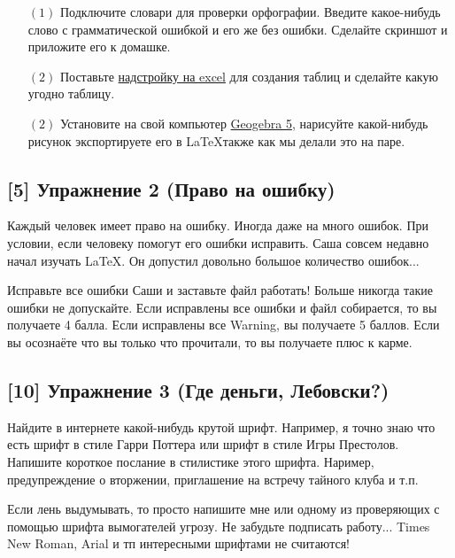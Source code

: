 \documentclass[12pt, a4paper, oneside]{article}
\begin{document}

\begin{itemize}
	\item[$(1)$]  Подключите словари для проверки орфографии. Введите какое-нибудь слово с грамматической ошибкой и его же без ошибки. Сделайте скриншот и приложите его к домашке. 
	\item [$(2)$]  Поставьте \href{https://www.ctan.org/pkg/excel2latex}{надстройку на excel} для создания таблиц и сделайте какую угодно таблицу. 
	\item[$(2)$]  Установите на свой компьютер \href{https://www.geogebra.org/download?lang=ru }{Geogebra 5}, нарисуйте какой-нибудь рисунок экспортируете его в \LaTeX также как мы делали это на паре. 
\end{itemize}


\subsection*{[5]  Упражнение 2 (Право на ошибку)}

Каждый человек имеет право на ошибку. Иногда даже на много ошибок. При условии, если человеку помогут его ошибки исправить. Саша совсем недавно начал изучать \LaTeX{}. Он допустил довольно большое количество ошибок...

Исправьте все ошибки Саши и заставьте файл работать! Больше никогда такие ошибки не допускайте. Если исправлены все ошибки и файл собирается, то вы получаете 4 балла. Если исправлены все Warning, вы получаете 5 баллов. Если вы осознаёте что вы только что прочитали, то вы получаете плюс к карме.



\subsection*{[10]  Упражнение 3 (Где деньги, Лебовски?)}

Найдите в интернете какой-нибудь крутой шрифт.  Например, я точно знаю что есть шрифт в стиле Гарри Поттера или шрифт в стиле Игры Престолов. Напишите короткое послание в стилистике этого шрифта. Наример, предупреждение о вторжении, приглашение на встречу тайного клуба и т.п.

Если лень выдумывать, то просто напишите мне или одному из проверяющих с помощью шрифта вымогателей угрозу.  Не забудьте подписать работу...   Times New Roman, Arial и тп интересными шрифтами не считаются!
\end{document}
